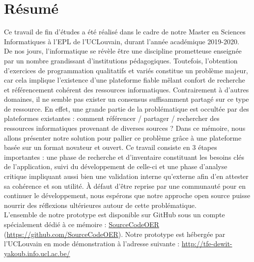 \chapter*{Résumé}

Ce travail de fin d'études a été réalisé dans le cadre de notre Master en Sciences Informatiques à l'EPL de l'UCLouvain, durant l'année académique 2019-2020.\\

De nos jours, l’informatique se révèle être une discipline prometteuse enseignée par un nombre grandissant d’institutions pédagogiques.
Toutefois, l'obtention d’exercices de programmation qualitatifs et variés constitue un problème majeur, car cela implique l'existence d'une plateforme fiable mêlant confort de recherche et référencement cohérent des ressources informatiques.
Contrairement à d'autres domaines, il ne semble pas exister un consensus suffisamment partagé sur ce type de ressource. En effet, une grande partie de la problématique est occultée par des plateformes existantes : comment référencer / partager / rechercher des ressources informatiques provenant de diverses sources ?
Dans ce mémoire, nous allons présenter notre solution pour pallier ce problème grâce à une plateforme basée sur un format novateur et ouvert.
Ce travail consiste en 3 étapes importantes : une phase de recherche et d'inventaire constituant les besoins clés de l'application, suivi du développement de celle-ci et une phase d'analyse critique impliquant aussi bien une validation interne qu'externe afin d'en attester sa cohérence et son utilité.
À défaut d'être reprise par une communauté pour en continuer le développement, nous espérons que notre approche open source puisse nourrir des réflexions ultérieures autour de cette problématique.\\

L'ensemble de notre prototype est disponible sur GitHub sous un compte spécialement dédié à ce mémoire : 
\href{https://github.com/SourceCodeOER}{SourceCodeOER} (\href{https://github.com/SourceCodeOER}{https://github.com/SourceCodeOER}). 
Notre prototype est hébergée par l'UCLouvain en mode démonstration à l'adresse suivante : \href{http://tfe-dewit-yakoub.info.ucl.ac.be/}{http://tfe-dewit-yakoub.info.ucl.ac.be/} \\

\iffalse

